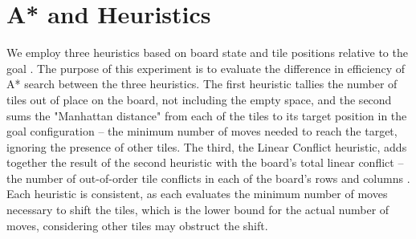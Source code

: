 
\section{A* and Heuristics}
\label{sec:background}

We employ three heuristics based on board state and tile positions relative to the goal \cite{aima}.  The purpose of this experiment is to evaluate the difference in efficiency of A* search between the three heuristics.  The first heuristic tallies the number of tiles out of place on the board, not including the empty space, and the second sums the "Manhattan distance" from each of the tiles to its target position in the goal configuration -- the minimum number of moves needed to reach the target, ignoring the presence of other tiles.  The third, the Linear Conflict heuristic, adds together the result of the second heuristic with the board's total linear conflict -- the number of out-of-order tile conflicts in each of the board's rows and columns \cite{GeneratingAdmissableHeuristics}.  Each heuristic is consistent, as each evaluates the minimum number of moves necessary to shift the tiles, which is the lower bound for the actual number of moves, considering other tiles may obstruct the shift. 

